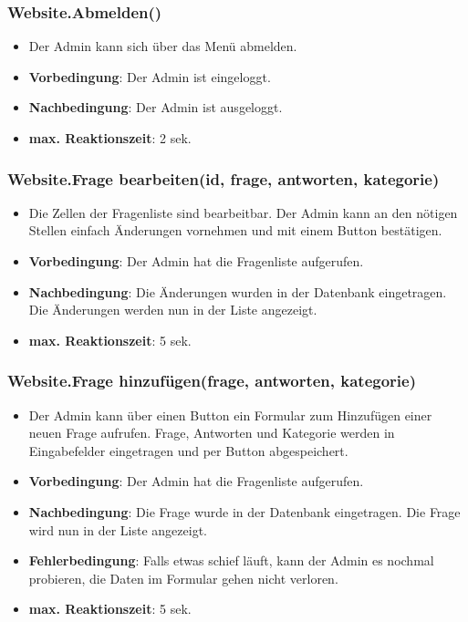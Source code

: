 \documentclass[fontsize=12pt,paper=a4,twoside]{scrartcl}
\begin{document}
\subsubsection{Website.Abmelden()}
\begin{itemize}
\item Der Admin kann sich über das Menü abmelden.
\item \textbf{Vorbedingung}: Der Admin ist eingeloggt.
\item \textbf{Nachbedingung}: Der Admin ist ausgeloggt.
\item \textbf{max. Reaktionszeit}: 2 sek.
\end{itemize}

\subsubsection{Website.Frage bearbeiten(id, frage, antworten, kategorie)}
\begin{itemize}
\item Die Zellen der Fragenliste sind bearbeitbar. Der Admin kann an den nötigen Stellen einfach Änderungen vornehmen und mit einem Button bestätigen.
\item \textbf{Vorbedingung}: Der Admin hat die Fragenliste aufgerufen.
\item \textbf{Nachbedingung}: Die Änderungen wurden in der Datenbank eingetragen. Die Änderungen werden nun in der Liste angezeigt.
\item \textbf{max. Reaktionszeit}: 5 sek.
\end{itemize}

\subsubsection{Website.Frage hinzufügen(frage, antworten, kategorie)}
\begin{itemize}
\item Der Admin kann über einen Button ein Formular zum Hinzufügen einer neuen Frage aufrufen. Frage, Antworten und Kategorie werden in Eingabefelder eingetragen und per Button abgespeichert.
\item \textbf{Vorbedingung}: Der Admin hat die Fragenliste aufgerufen.
\item \textbf{Nachbedingung}: Die Frage wurde in der Datenbank eingetragen. Die Frage wird nun in der Liste angezeigt.
\item \textbf{Fehlerbedingung}: Falls etwas schief läuft, kann der Admin es nochmal probieren, die Daten im Formular gehen nicht verloren.
\item \textbf{max. Reaktionszeit}: 5 sek.
\end{itemize}
\end{document}
